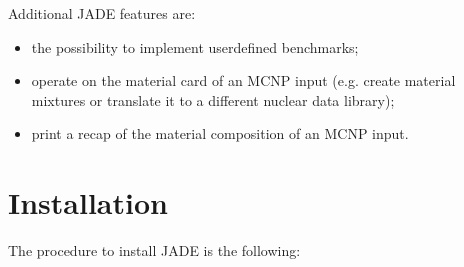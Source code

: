 \documentclass[letterpaper,10pt,english]{sphinxmanual}
\begin{document}
Additional JADE features are:
\begin{itemize}
\item {} 
the possibility to implement user\sphinxhyphen{}defined benchmarks;

\item {} 
operate on the material card of an MCNP input (e.g. create material mixtures
or translate it to a different nuclear data library);

\item {} 
print a recap of the material composition of an MCNP input.

\end{itemize}


\chapter{Installation}
\label{\detokenize{usage/installation:installation}}\label{\detokenize{usage/installation:install}}\label{\detokenize{usage/installation::doc}}
The procedure to install JADE is the following:
\end{document}
